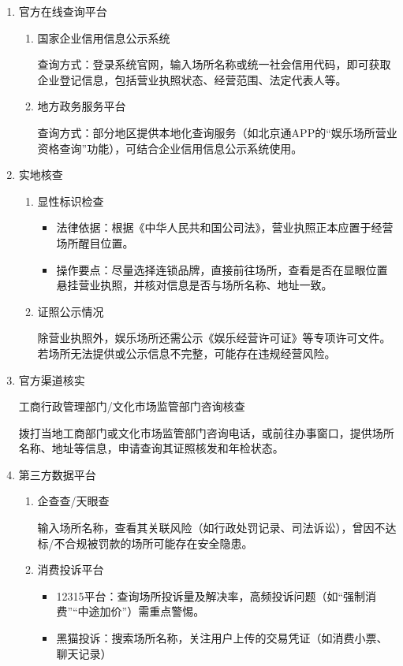 \documentclass{amznotes}
\begin{document}
\begin{enumerate}
  \item 官方在线查询平台
  \begin{enumerate}
    \item 国家企业信用信息公示系统

    查询方式：登录系统官网，输入场所名称或统一社会信用代码，即可获取企业登记信息，包括营业执照状态、经营范围、法定代表人等。

    \item 地方政务服务平台

    查询方式：部分地区提供本地化查询服务（如北京通APP的“娱乐场所营业资格查询”功能），可结合企业信用信息公示系统使用。
  \end{enumerate}
 \item 实地核查
 \begin{enumerate}
  \item 显性标识检查
  \begin{itemize}
    \item 法律依据：根据《中华人民共和国公司法》，营业执照正本应置于经营场所醒目位置。
    \item 操作要点：尽量选择连锁品牌，直接前往场所，查看是否在显眼位置悬挂营业执照，并核对信息是否与场所名称、地址一致。
  \end{itemize}
  \item 证照公示情况

  除营业执照外，娱乐场所还需公示《娱乐经营许可证》等专项许可文件。若场所无法提供或公示信息不完整，可能存在违规经营风险。
 \end{enumerate}
 \item 官方渠道核实

 工商行政管理部门/文化市场监管部门咨询核查

 拨打当地工商部门或文化市场监管部门咨询电话，或前往办事窗口，提供场所名称、地址等信息，申请查询其证照核发和年检状态。

 \item 第三方数据平台

 \begin{enumerate}
  \item 企查查/天眼查

  输入场所名称，查看其关联风险（如行政处罚记录、司法诉讼），曾因不达标/不合规被罚款的场所可能存在安全隐患。
  \item 消费投诉平台
         \begin{itemize}
          \item 12315平台：查询场所投诉量及解决率，高频投诉问题（如“强制消费”“中途加价”）需重点警惕。
          \item 黑猫投诉：搜索场所名称，关注用户上传的交易凭证（如消费小票、聊天记录）
         \end{itemize}
 \end{enumerate}
\end{enumerate}
\end{document}
